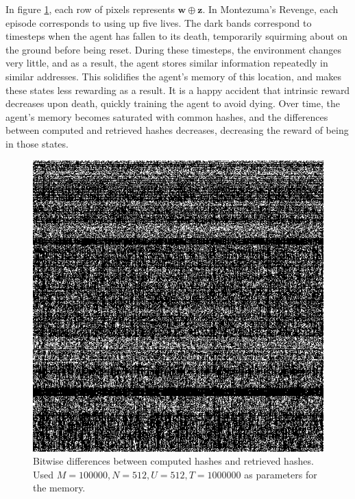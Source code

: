 \documentclass[journal, onecolumn, 12pt, draftclsnofoot]{IEEEtran}
\newcommand{\mbf}[1]{\mathbf{#1}}
\begin{document}
	\par In figure \ref{fig:xor-diffs-montezuma-revenge}, each row of pixels represents $\mbf{w} \oplus \mbf{z}$. In Montezuma's Revenge, each episode corresponds to using up five lives. The dark bands correspond to timesteps when the agent has fallen to its death, temporarily squirming about on the ground before being reset. During these timesteps, the environment changes very little, and as a result, the agent stores similar information repeatedly in similar addresses. This solidifies the agent's memory of this location, and makes these states less rewarding as a result. It is a happy accident that intrinsic reward decreases upon death, quickly training the agent to avoid dying. Over time, the agent's memory becomes saturated with common hashes, and the differences between computed and retrieved hashes decreases, decreasing the reward of being in those states.
	\begin{figure}[ht]
		\begin{center}
		\includegraphics[scale=0.75]{fig/MontezumeRevenge-v0-xor-diffs.jpg}
	\end{center}
		\caption{Bitwise differences between computed hashes and retrieved hashes. Used $M = 100000, N=512, U=512, T=1000000$ as parameters for the memory.}
		\label{fig:xor-diffs-montezuma-revenge}
	\end{figure}
\end{document}
